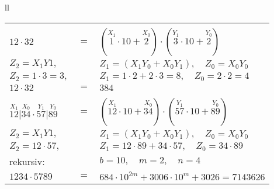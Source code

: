 \documentclass[
	final,
	a4paper,
	oneside,
	parskip=full,
	headings=standardclasses,
	headings=big,
	pointednumbers,
    fleqn
]{scrartcl}
\newcommand{\kl}[1]{{\left( #1 \right)}}
\begin{document}
\begin{tabular}[t]{ll}
\begin{tabular}[t]{lll}
            \cline{1-1} & & \\
            $ 12 \cdot 32$ & $=$ & $\kl{\overset{X_1}{1}\cdot 10 + \overset{X_0}{2}} \cdot
                                    \kl{\overset{Y_1}{3}\cdot 10 + \overset{Y_0}{2}}$ \\
            $Z_2 = X_1Y1,$ & & $Z_1 = \kl{X_1Y_0 + X_0Y_1}, \quad Z_0 = X_0Y_0 $ \\
            $Z_2 = 1\cdot 3 = 3,$ & & $Z_1 = 1 \cdot 2 + 2 \cdot 3 = 8, \quad Z_0 = 2 \cdot 2 = 4$ \\
            $ 12 \cdot 32$ & $=$ & $384$ \\
            \cline{1-1} & & \\
            $ \overset{X_1}{12} \vert \overset{X_0}{34} \cdot \overset{Y_1}{57} \vert \overset{Y_0}{89}$ & $=$ & $\kl{\overset{X_1}{12}\cdot 10 + \overset{X_0}{34}} \cdot
                                    \kl{\overset{Y_1}{57}\cdot 10 + \overset{Y_0}{89}}$ \\
            $Z_2 = X_1Y1,$ & & $Z_1 = \kl{X_1Y_0 + X_0Y_1}, \quad Z_0 = X_0Y_0 $ \\
            $Z_2 = 12\cdot 57 ,$ & & $Z_1 = 12 \cdot 89 + 34 \cdot 57, \quad Z_0 = 34 \cdot 89$ \\
            rekursiv: & & $b = 10, \quad m = 2, \quad n = 4$ \\
            $ 1234 \cdot 5789$ & $=$ & $684 \cdot 10^{2m} + 3006 \cdot 10^{m} + 3026 = 7143626$
        \end{tabular}
    \end{tabular}
    

    
\end{document}
